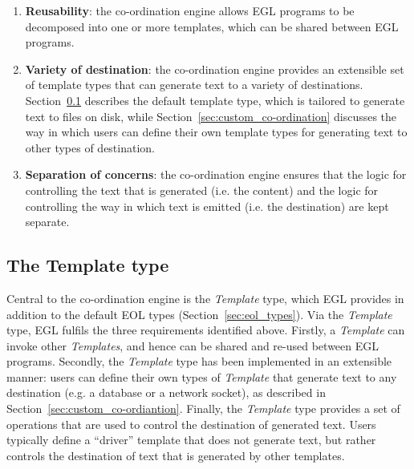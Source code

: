 \begin{enumerate}
	\item \textbf{Reusability}: the co-ordination engine allows EGL programs to be
	                   decomposed into one or more templates, which
	                   can be shared between EGL programs.

	\item \textbf{Variety of destination}: the co-ordination engine provides an
	                              extensible set of template types that can
	                              generate text to a variety of destinations.
	                              Section~\ref{sec:egl_template_type} describes
	                              the default template type, which is 
	                              tailored to generate text to files on disk, 
	                              while Section~\ref{sec:custom_co-ordination} 
	                              discusses the way in  which users can define 
	                              their own template types for generating text to
	                              other types of destination.
	
	\item \textbf{Separation of concerns}: the co-ordination engine ensures that the 
	                              logic for controlling the text that is
	                              generated (i.e. the content) and the logic for
	                              controlling the way in which text is emitted
	                              (i.e. the destination) are kept separate.
\end{enumerate}

\subsection{The Template type}
\label{sec:egl_template_type}
Central to the co-ordination engine is the \emph{Template} type, 
which EGL provides in addition to the default EOL types
(Section~\ref{sec:eol_types}). Via the \emph{Template} type, EGL
fulfils the three requirements identified above. Firstly, a \emph{Template} 
can invoke other \emph{Templates}, and hence can be shared and re-used 
between EGL programs. Secondly, the \emph{Template} type has been implemented
in an extensible manner: users can define their own types of \emph{Template} 
that generate text to any destination (e.g. a database or a network
socket), as described in Section~\ref{sec:custom_co-ordiantion}. Finally, 
the \emph{Template} type provides a set of operations that are used to 
control the destination of generated text. Users typically define a ``driver''
template that does not generate text, but rather controls the destination 
of text that is generated by other templates. 

